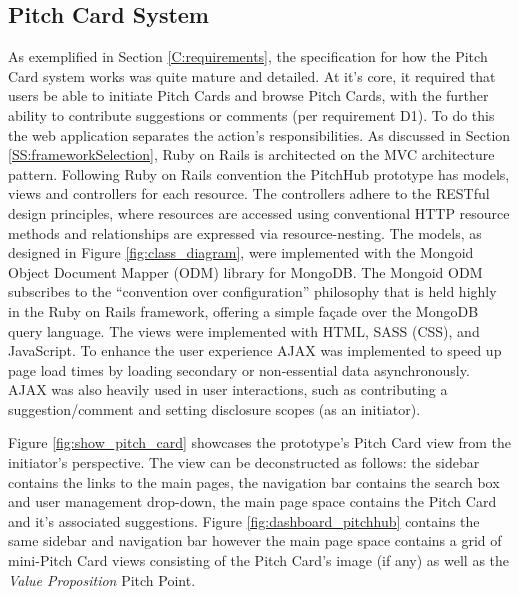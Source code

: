 \subsection{Pitch Card System}
As exemplified in Section \ref{C:requirements}, the specification for how the Pitch Card system works was quite mature and detailed. At it's core, it required that users be able to initiate Pitch Cards and browse Pitch Cards, with the further ability to contribute suggestions or comments (per requirement D1). To do this the web application separates the action's responsibilities. As discussed in Section \ref{SS:frameworkSelection}, Ruby on Rails is architected on the MVC architecture pattern. Following Ruby on Rails convention the PitchHub prototype has models, views and controllers for each resource. The controllers adhere to the RESTful design principles, where resources are accessed using conventional HTTP resource methods and relationships are expressed via resource-nesting. The models, as designed in Figure \ref{fig:class_diagram}, were implemented with the Mongoid \cite{Mongo4:online} Object Document Mapper (ODM) library for MongoDB. The Mongoid ODM subscribes to the ``convention over configuration'' philosophy that is held highly in the Ruby on Rails framework, offering a simple fa\c{c}ade over the MongoDB query language. The views were implemented with HTML, SASS (CSS), and JavaScript. To enhance the user experience AJAX was implemented to speed up page load times by loading secondary or non-essential data asynchronously. AJAX was also heavily used in user interactions, such as contributing a suggestion/comment and setting disclosure scopes (as an initiator).
\par
Figure \ref{fig:show_pitch_card} showcases the prototype's Pitch Card view from the initiator's perspective. The view can be deconstructed as follows: the sidebar contains the links to the main pages, the navigation bar contains the search box and user management drop-down, the main page space contains the Pitch Card and it's associated suggestions. Figure \ref{fig:dashboard_pitchhub} contains the same sidebar and navigation bar however the main page space contains a grid of mini-Pitch Card views consisting of the Pitch Card's image (if any) as well as the \textit{Value Proposition} Pitch Point.

